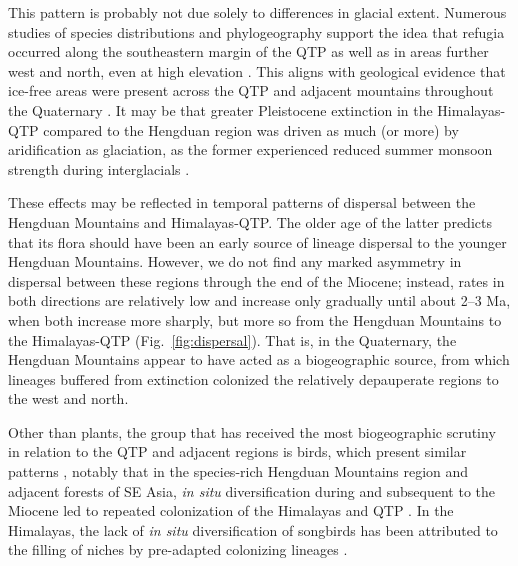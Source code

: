 \documentclass[9pt,twocolumn,twoside,lineno]{pnas-new}
\begin{document}
This pattern is probably not due solely to differences in glacial
extent. Numerous studies of species distributions
\citep[e.g.,][]{srinivasan2014,lopez2011} and phylogeography
\citep[e.g.,][]{CunY2010,WangBS2011,lei2014,meng2015} support the idea
that refugia occurred along the southeastern margin of the QTP as well
as in areas further west and north, even at high elevation
\citep[e.g.,][]{wang2009,sun2010,opgenoorth2010}. This aligns with
geological evidence that ice-free areas were present across the QTP
and adjacent mountains throughout the Quaternary
\citep[see][]{owen2014}. It may be that greater Pleistocene extinction
in the Himalayas-QTP compared to the Hengduan region was driven as
much (or more) by aridification as glaciation, as the former
experienced reduced summer monsoon strength during interglacials
\citep{owen2008}.

These effects may be reflected in temporal patterns of dispersal
between the Hengduan Mountains and Himalayas-QTP. The older age of the
latter predicts that its flora should have been an early source of
lineage dispersal to the younger Hengduan Mountains. However, we do
not find any marked asymmetry in dispersal between these regions
through the end of the Miocene; instead, rates in both directions are
relatively low and increase only gradually until about 2--3 Ma, when
both increase more sharply, but more so from the Hengduan Mountains to
the Himalayas-QTP (Fig.~\ref{fig:dispersal}). That is, in the
Quaternary, the Hengduan Mountains appear to have acted as a
biogeographic source, from which lineages buffered from extinction
colonized the relatively depauperate regions to the west and
north. %




Other than plants, the group that has received the most biogeographic
scrutiny in relation to the QTP and adjacent regions is birds, which
present similar patterns \citep[see][]{packert2015}, notably that in
the species-rich Hengduan Mountains region and adjacent forests of SE
Asia, \textit{in situ} diversification during and subsequent to the
Miocene led to repeated colonization of the Himalayas and QTP
\citep[e.g.,][]{liu2016,tietze2013,johansson2007}. In the Himalayas,
the lack of \textit{in situ} diversification of songbirds has been
attributed to the filling of niches by pre-adapted colonizing lineages
\citep{price2014}.
\end{document}
